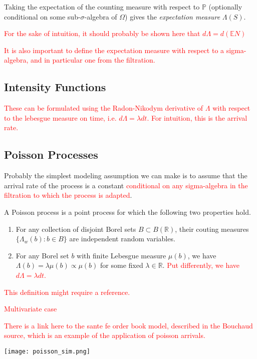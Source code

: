 \documentclass[honours,12pt]{unswthesis}
\numberwithin{equation}{section}
\begin{document}
Taking the expectation of the counting measure with respect to $\mathbb{P}$ (optionally conditional on some sub-$\sigma$-algebra of $\Omega$) gives the \textit{expectation measure} $\Lambda(S)$.

\textcolor{red}{For the sake of intuition, it should probably be shown here that $d\Lambda=d(\mathbb{E}N)$}

\textcolor{red}{It is also important to define the expectation measure with respect to a sigma-algebra, and in particular one from the filtration.}

\subsection{Intensity Functions}
\textcolor{red}{These can be formulated using the Radon-Nikodym derivative of $\Lambda$ with respect to the lebesgue measure on time, i.e. $d\Lambda=\lambda dt$.}
\textcolor{red}{For intuition, this is the arrival rate.}

\subsection{Poisson Processes}
Probably the simplest modeling assumption we can make is to assume that the arrival rate of the process is a constant \textcolor{red}{conditional on any sigma-algebra in the filtration to which the process is adapted}.

A Poisson process is a point process for which the following two properties hold.
\begin{enumerate}
	\item For any collection of disjoint Borel sets $B\subset B(\mathbb R)$, their couting measures $\{\Lambda_w(b) : b\in B\}$ are independent random variables.
	\item For any Borel set $b$ with finite Lebesgue measure $\mu(b)$, we have $\Lambda(b)=\lambda \mu(b)\propto \mu(b)$ for some fixed $\lambda\in\mathbb{R}$. \textcolor{red}{Put differently, we have $d\Lambda=\lambda dt$.}
\end{enumerate}

\textcolor{red}{This definition might require a reference.}

\textcolor{red}{Multivariate case}

\textcolor{red}{There is a link here to the sante fe order book model, described in the Bouchaud source, which is an example of the application of poisson arrivals.}

\texttt{[image: poisson\_sim.png]}
\end{document}
